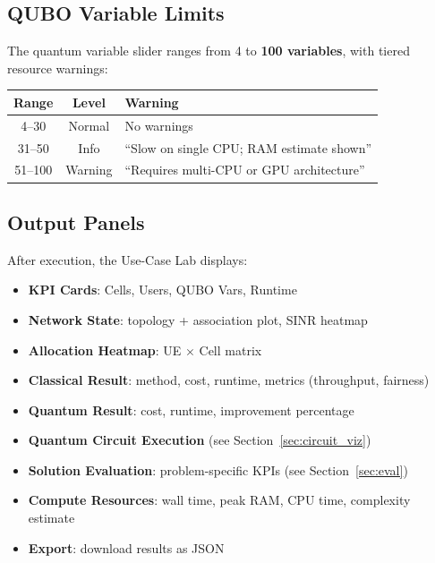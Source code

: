 \documentclass[11pt,a4paper]{article}
\begin{document}
\subsection{QUBO Variable Limits}

The quantum variable slider ranges from 4 to \textbf{100 variables}, with tiered resource warnings:

\begin{center}
\begin{tabular}{ccl}
  \toprule
  \textbf{Range} & \textbf{Level} & \textbf{Warning} \\
  \midrule
  4--30 & \textcolor{green!60!black}{Normal} & No warnings \\
  31--50 & \textcolor{yellow!60!black}{Info} & ``Slow on single CPU; RAM estimate shown'' \\
  51--100 & \textcolor{red!80!black}{Warning} & ``Requires multi-CPU or GPU architecture'' \\
  \bottomrule
\end{tabular}
\end{center}

\subsection{Output Panels}

After execution, the Use-Case Lab displays:

\begin{itemize}
  \item \textbf{KPI Cards}: Cells, Users, QUBO Vars, Runtime
  \item \textbf{Network State}: topology + association plot, SINR heatmap
  \item \textbf{Allocation Heatmap}: UE $\times$ Cell matrix
  \item \textbf{Classical Result}: method, cost, runtime, metrics (throughput, fairness)
  \item \textbf{Quantum Result}: cost, runtime, improvement percentage
  \item \textbf{Quantum Circuit Execution} (see Section~\ref{sec:circuit_viz})
  \item \textbf{Solution Evaluation}: problem-specific KPIs (see Section~\ref{sec:eval})
  \item \textbf{Compute Resources}: wall time, peak RAM, CPU time, complexity estimate
  \item \textbf{Export}: download results as JSON
\end{itemize}
\end{document}
